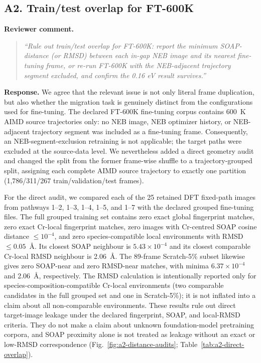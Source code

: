 
\subsection*{A2. Train/test overlap for FT-600K}

\noindent\textbf{Reviewer comment.}
\begin{quote}
\itshape
``Rule out train/test overlap for FT-600K: report the minimum SOAP-distance (or RMSD) between each in-gap NEB image and its nearest fine-tuning frame, or re-run FT-600K with the NEB-adjacent trajectory segment excluded, and confirm the 0.16 eV result survives.''
\end{quote}

\noindent\textbf{Response.}
We agree that the relevant issue is not only literal frame duplication, but also whether the migration task is genuinely distinct from the configurations used for fine-tuning. The declared FT-600K fine-tuning corpus contains 600~K AIMD source trajectories only: no NEB image, NEB optimizer history, or NEB-adjacent trajectory segment was included as a fine-tuning frame. Consequently, an NEB-segment-exclusion retraining is not applicable; the target paths were excluded at the source-data level. We nevertheless added a direct geometry audit and changed the split from the former frame-wise shuffle to a trajectory-grouped split, assigning each complete AIMD source trajectory to exactly one partition (1,786/311/267 train/validation/test frames).

For the direct audit, we compared each of the 25 retained DFT fixed-path images from pathways 1--2, 1--3, 1--4, 1--5, and 1--7 with the declared grouped fine-tuning files. The full grouped training set contains zero exact global fingerprint matches, zero exact Cr-local fingerprint matches, zero images with Cr-centred SOAP cosine distance $\leq 10^{-4}$, and zero species-compatible local environments with RMSD $\leq 0.05$~\AA. Its closest SOAP neighbour is $5.43\times10^{-4}$ and its closest comparable Cr-local RMSD neighbour is 2.06~\AA. The 89-frame Scratch-5\% subset likewise gives zero SOAP-near and zero RMSD-near matches, with minima $6.37\times10^{-4}$ and 2.06~\AA, respectively. The RMSD calculation is intentionally reported only for species-composition-compatible Cr-local environments (two comparable candidates in the full grouped set and one in Scratch-5\%); it is not inflated into a claim about all non-comparable environments. These results rule out direct target-image leakage under the declared fingerprint, SOAP, and local-RMSD criteria. They do not make a claim about unknown foundation-model pretraining corpora, and SOAP proximity alone is not treated as leakage without an exact or low-RMSD correspondence (Fig.~\ref{fig:a2-distance-audits}; Table~\ref{tab:a2-direct-overlap}).

